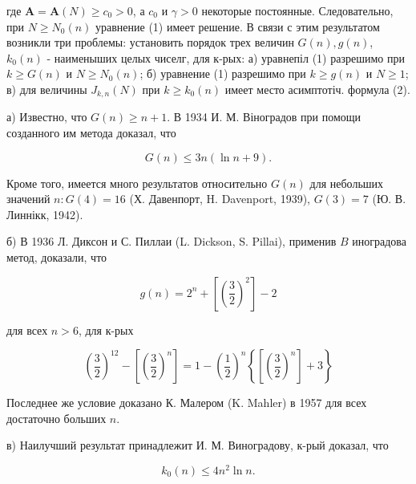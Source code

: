 \documentclass[10pt]{article}
\begin{document}
где $\boldsymbol{A}=\boldsymbol{A}(N) \geqslant c_{0}>0$, а $c_{0}$ и $\gamma>0$ некоторые постоянные. Следовательно, при $N \geqslant N_{0}(n)$ уравнение (1) имеет решение. В связи с этим результатом возникли три проблемы: установить порядок трех величин $G(n), g(n)$, $k_{0}(n)$ - наименыших целых чиселг, для к-рых: а) уравнепіл (1) разрешимо при $k \geqslant G(n)$ и $N \geqslant N_{0}(n)$; б) уравнение (1) разрешимо при $k \geqslant g(n)$ и $N \geqslant 1$; в) для величины $J_{k, n}(N)$ при $k \geqslant k_{0}(n)$ имеет место асимптотіч. формула (2).



а) Известно, что $G(n) \geqslant n+1$. В 1934 И. М. Віноградов при помощи созданного им метода доказал, что



\[

G(n) \leqslant 3 n(\ln n+9) .

\]



Кроме того, имеется много результатов относительно $G(n)$ для небольших значений $n: G(4)=16$ (Х. Давенпорт, H. Davenport, 1939), $G(3)=7$ (Ю. В. Линнікк, 1942).



б) В 1936 Л. Диксон и С. Пиллаи (L. Dickson, S. Pillai), применив $B$ иноградова метод, доказали, что



\[

g(n)=2^{n}+\left[\left(\frac{3}{2}\right)^{2}\right]-2

\]



для всех $n>6$, для к-рых



\[

\left(\frac{3}{2}\right)^{12}-\left[\left(\frac{3}{2}\right)^{n}\right]=1-\left(\frac{1}{2}\right)^{n}\left\{\left[\left(\frac{3}{2}\right)^{n}\right]+3\right\}

\]



Последнее же условие доказано К. Малером (K. Mahler) в 1957 для всех достаточно больших $n$.



в) Наилучший результат принадлежит И. М. Виноградову, к-рый доказал, что



\[

k_{0}(n) \leqslant 4 n^{2} \ln n .

\]
\end{document}
